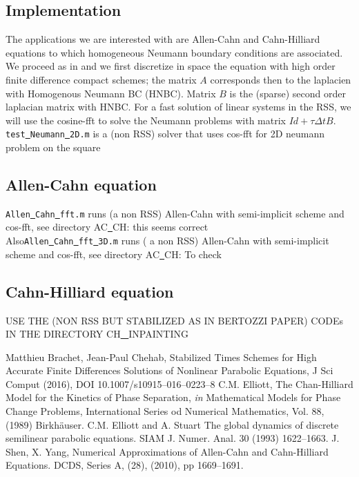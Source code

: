 \documentclass[11pt]{article}
\begin{document}
\subsection{Implementation}
%
%
The applications we are interested with are Allen-Cahn and Cahn-Hilliard equations to which homogeneous Neumann boundary conditions are associated.
We proceed as in \cite{Brachet ChehabJSC} and we first discretize in space the equation with high order finite difference compact schemes; the matrix $A$ corresponds then to the laplacien with Homogenous Neumann BC (HNBC).  Matrix $B$ is the (sparse) second order laplacian matrix with HNBC.
For a fast solution of linear systems in the RSS, we will use the cosine-fft to solve the Neumann problems with matrix $Id +\tau \Delta t B$.
{\tt test\underline{\ }Neumann\underline{\ }2D.m} is a (non RSS) solver that uses cos-fft for 2D neumann problem on the square
\subsection{Allen-Cahn equation}
{\tt Allen\underline{\ }Cahn\underline{\ }fft.m} runs (a non RSS) Allen-Cahn with semi-implicit scheme and cos-fft, see directory AC\underline{\ }CH: this seems correct\\
Also{\tt Allen\underline{\ }Cahn\underline{\ }fft\underline{\ }3D.m} runs ( a non RSS) Allen-Cahn with semi-implicit scheme and cos-fft, see directory AC\underline{\ }CH: To check

\subsection{Cahn-Hilliard equation}
USE THE (NON RSS BUT STABILIZED AS IN BERTOZZI PAPER) CODEs IN THE DIRECTORY
CH\underline{ \ }INPAINTING
%
%
\begin{thebibliography}{99}
 Matthieu Brachet, Jean-Paul Chehab,
Stabilized Times Schemes for High Accurate Finite
Differences Solutions of Nonlinear Parabolic Equations, J Sci Comput (2016),
DOI 10.1007/s10915--016--0223--8
 C.M. Elliott, The Chan-Hilliard Model for the Kinetics of Phase Separation, 
{\it in} Mathematical Models for Phase Change Problems, International Series od Numerical Mathematics, Vol. 88, (1989) Birkh\"auser.
 C.M. Elliott and A. Stuart The global dynamics of discrete semilinear parabolic equations. SIAM J. Numer. Anal. 30 (1993) 1622--1663.
 J. Shen, X. Yang, Numerical Approximations of Allen-Cahn and Cahn-Hilliard Equations. DCDS, Series A, (28), (2010), pp 1669--1691.
\end{thebibliography}
\end{document}
